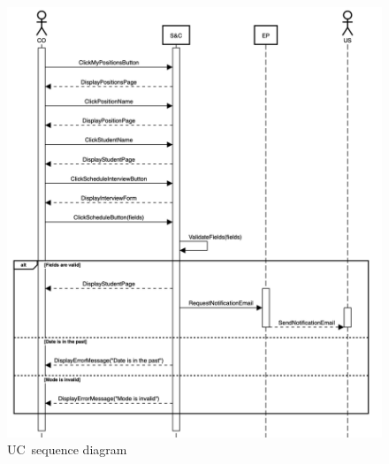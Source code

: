 \begin{figure}
    \centering
    \includegraphics[width=16cm]{images/sequence-diagrams/company-schedules-interview.png}
    \caption{UC\theuc\ sequence diagram}
\end{figure}


